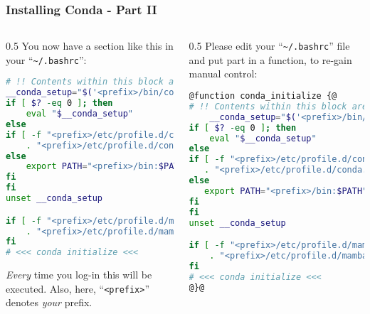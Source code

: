\begin{frame}[fragile]
  \frametitle{Installing Conda - Part II}
  \footnotesize
  \begin{columns}[t]
    \begin{column}{0.5\textwidth}
       You now have a section like this in your ``\texttt{\textasciitilde/.bashrc}'':
       \begin{lstlisting}[language=Bash, style=Shell, basicstyle=\tiny, breaklines=true]
# !! Contents within this block are managed by 'conda init' !!
__conda_setup="$('<prefix>/bin/conda' 'shell.bash' 'hook' 2> /dev/null)"
if [ $? -eq 0 ]; then
    eval "$__conda_setup"
else
if [ -f "<prefix>/etc/profile.d/conda.sh" ]; then
    . "<prefix>/etc/profile.d/conda.sh"
else
    export PATH="<prefix>/bin:$PATH"
fi
fi
unset __conda_setup

if [ -f "<prefix>/etc/profile.d/mamba.sh" ]; then
    . "<prefix>/etc/profile.d/mamba.sh"
fi
# <<< conda initialize <<<
      \end{lstlisting}
      \bcattention \emph{Every} time you log-in this will be executed. Also, here, ``\texttt{<prefix>}'' denotes \emph{your} prefix.
    \end{column}
    \begin{column}{0.5\textwidth}
       \pause
       {\footnotesize Please edit your ``\texttt{\textasciitilde/.bashrc}'' file and put part in a function, to re-gain manual control:}
       \begin{lstlisting}[language=Bash, style=Shell, basicstyle=\tiny, breaklines=true]
@function conda_initialize {@
# !! Contents within this block are managed by 'conda init' !!
    __conda_setup="$('<prefix>/bin/conda' 'shell.bash' 'hook' 2> /dev/null)"
if [ $? -eq 0 ]; then
    eval "$__conda_setup"
else
if [ -f "<prefix>/etc/profile.d/conda.sh" ]; then
   . "<prefix>/etc/profile.d/conda.sh"
else
   export PATH="<prefix>/bin:$PATH"
fi
fi
unset __conda_setup

if [ -f "<prefix>/etc/profile.d/mamba.sh" ]; then 
    . "<prefix>/etc/profile.d/mamba.sh"
fi
# <<< conda initialize <<<
@}@
      \end{lstlisting}
    \end{column}
  \end{columns}
\end{frame}


